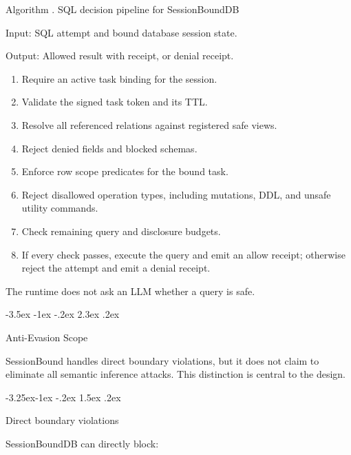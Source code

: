 \documentclass[10pt,twocolumn]{article}
\makeatletter
\newcounter{algorithm}
\renewcommand\section{\@startsection{section}{1}{\z@}%
  {-3.5ex \@plus -1ex \@minus -.2ex}%
  {2.3ex \@plus .2ex}%
  {\normalfont\Large\bfseries\raggedright}}
\renewcommand\subsection{\@startsection{subsection}{2}{\z@}%
  {-3.25ex\@plus -1ex \@minus -.2ex}%
  {1.5ex \@plus .2ex}%
  {\normalfont\large\bfseries\raggedright}}
\makeatother
\begin{document}
\begin{center}
\label{alg:sql-decision-pipeline}
\begin{minipage}{0.9\linewidth}
Algorithm \thealgorithm. SQL decision pipeline for SessionBoundDB

Input: SQL attempt and bound database session state.

Output: Allowed result with receipt, or denial receipt.

\begin{enumerate}
\item Require an active task binding for the session.
\item Validate the signed task token and its TTL.
\item Resolve all referenced relations against registered safe views.
\item Reject denied fields and blocked schemas.
\item Enforce row scope predicates for the bound task.
\item Reject disallowed operation types, including mutations, DDL, and
unsafe utility commands.
\item Check remaining query and disclosure budgets.
\item If every check passes, execute the query and emit an allow receipt;
otherwise reject the attempt and emit a denial receipt.
\end{enumerate}
\end{minipage}
\end{center}

The runtime does not ask an LLM whether a query is safe.


\hypertarget{anti-evasion-scope}{%
\section{Anti-Evasion Scope}\label{anti-evasion-scope}}

SessionBound handles direct boundary violations, but it does not claim
to eliminate all semantic inference attacks. This distinction is central
to the design.

\hypertarget{direct-boundary-violations}{%
\subsection{Direct boundary
violations}\label{direct-boundary-violations}}

SessionBoundDB can directly block:
\end{document}
